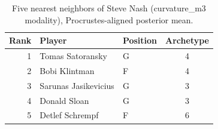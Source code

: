 \begin{table}[htbp]
  \centering\small
  \begin{tabular}{rllc}
    \toprule
    Rank & Player & Position & Archetype \\
    \midrule
    1 & Tomas Satoransky & G & 4 \\
    2 & Bobi Klintman & F & 4 \\
    3 & Sarunas Jasikevicius & G & 3 \\
    4 & Donald Sloan & G & 3 \\
    5 & Detlef Schrempf & F & 6 \\
    \bottomrule
  \end{tabular}
  \caption{Five nearest neighbors of Steve Nash (curvature_m3 modality), Procrustes-aligned posterior mean.}
  \label{tab:Steve_Nash_neighbors_curvature_m3}
\end{table}

